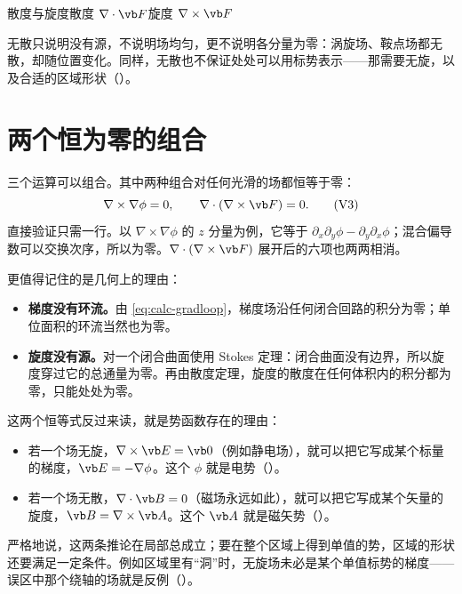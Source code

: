 \begin{compare}{散度与旋度}{散度 $\nabla\cdot\vb F$}{旋度 $\nabla\times\vb F$}
\end{compare}

\begin{pitfall}[“$\nabla\cdot\vb B=0$，所以 $\vb B$ 是均匀的”]
无散只说明没有源，不说明场均匀，更不说明各分量为零：涡旋场、鞍点场都无散，却随位置变化。同样，无散也不保证处处可以用标势表示——那需要无旋，以及合适的区域形状（）。
\end{pitfall}

\section{两个恒为零的组合}\label{sec:calc-zeros}

三个运算可以组合。其中两种组合对任何光滑的场都恒等于零：
\begin{equation}
\nabla\times\nabla\phi=0,
\qquad \nabla\cdot(\nabla\times\vb F)=0.
\tag{V3}\label{id:zeros}
\end{equation}
直接验证只需一行。以 $\nabla\times\nabla\phi$ 的 $z$ 分量为例，它等于 $\partial_x\partial_y\phi-\partial_y\partial_x\phi$；混合偏导数可以交换次序，所以为零。$\nabla\cdot(\nabla\times\vb F)$ 展开后的六项也两两相消。

更值得记住的是几何上的理由：
\begin{itemize}
\item \textbf{梯度没有环流。}由 \eqref{eq:calc-gradloop}，梯度场沿任何闭合回路的积分为零；单位面积的环流当然也为零。
\item \textbf{旋度没有源。}对一个闭合曲面使用 Stokes 定理：闭合曲面没有边界，所以旋度穿过它的总通量为零。再由散度定理，旋度的散度在任何体积内的积分都为零，只能处处为零。
\end{itemize}

这两个恒等式反过来读，就是势函数存在的理由：
\begin{itemize}
\item 若一个场无旋，$\nabla\times\vb E=\vb 0$（例如静电场），就可以把它写成某个标量的梯度，$\vb E=-\nabla\phi$。这个 $\phi$ 就是电势（）。
\item 若一个场无散，$\nabla\cdot\vb B=0$（磁场永远如此），就可以把它写成某个矢量的旋度，$\vb B=\nabla\times\vb A$。这个 $\vb A$ 就是磁矢势（）。
\end{itemize}
严格地说，这两条推论在局部总成立；要在整个区域上得到单值的势，区域的形状还要满足一定条件。例如区域里有“洞”时，无旋场未必是某个单值标势的梯度—— 误区中那个绕轴的场就是反例（）。

